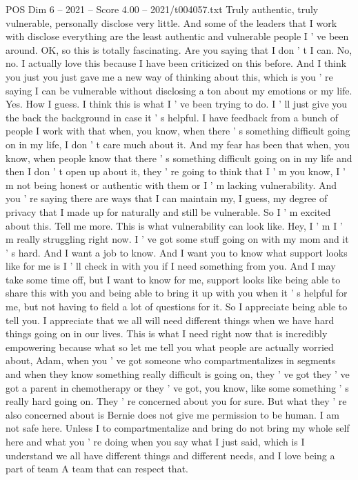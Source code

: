 \begin{textsample}{POS Dim 6 – 2021 – Score 4.00 – 2021/t004057.txt}
Truly authentic, truly vulnerable, personally disclose very little.
And some of the leaders that I work with disclose everything are the least authentic and vulnerable people I ' ve been around.
OK, so this is totally fascinating.
Are you saying that I don ' t I can.
No, no.
I actually love this because I have been criticized on this before.
And I think you just you just gave me a new way of thinking about this, which is you ' re saying I can be vulnerable without disclosing a ton about my emotions or my life.
Yes.
How I guess.
I think this is what I ' ve been trying to do.
I ' ll just give you the back the background in case it ' s helpful.
I have feedback from a bunch of people I work with that when, you know, when there ' s something difficult going on in my life, I don ' t care much about it.
And my fear has been that when, you know, when people know that there ' s something difficult going on in my life and then I don ' t open up about it, they ' re going to think that I ' m you know, I ' m not being honest or authentic with them or I ' m lacking vulnerability.
And you ' re saying there are ways that I can maintain my, I guess, my degree of privacy that I made up for naturally and still be vulnerable.
So I ' m excited about this.
Tell me more.
This is what vulnerability can look like.
Hey, I ' m I ' m really struggling right now.
I ' ve got some stuff going on with my mom and it ' s hard.
And I want a job to know.
And I want you to know what support looks like for me is I ' ll check in with you if I need something from you.
And I may take some time off, but I want to know for me, support looks like being able to share this with you and being able to bring it up with you when it ' s helpful for me, but not having to field a lot of questions for it.
So I appreciate being able to tell you.
I appreciate that we all will need different things when we have hard things going on in our lives.
This is what I need right now that is incredibly empowering because what so let me tell you what people are actually worried about, Adam, when you ' ve got someone who compartmentalizes in segments and when they know something really difficult is going on, they ' ve got they ' ve got a parent in chemotherapy or they ' ve got, you know, like some something ' s really hard going on.
They ' re concerned about you for sure.
But what they ' re also concerned about is Bernie does not give me permission to be human.
I am not safe here.
Unless I to compartmentalize and bring do not bring my whole self here and what you ' re doing when you say what I just said, which is I understand we all have different things and different needs, and I love being a part of team A team that can respect that.

\end{textsample}
